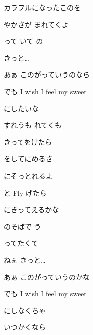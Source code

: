 \documentclass[14pt]{ltjsarticle}
\begin{document}
{  
カラフルになったこのを
  \jisho{}

  やかさが まれてくよ
  \jisho{}

  って いて の
  \jisho{}

  
きっと…
  \jisho{}

  
あぁ このがっていうのなら
  \jisho{}

  でも I wish I feel my sweet
  \jisho{}

  にしたいな
  \jisho{}

\item
  
すれうも れてくも
  \jisho{}

  きってをけたら
  \jisho{}

  をしてにめるさ
  \jisho{}

  にそっとれるよ
  \jisho{}

\item
  と Fly げたら
  \jisho{}

  にきってえるかな
  \jisho{}

  のそばで う
  \jisho{}

  ってたくて
  \jisho{}

  
ねぇ きっと…
  \jisho{}

  
あぁ このがっていうのかな
  \jisho{}

  でも I wish I feel my sweet
  \jisho{}

  にしなくちゃ
  \jisho{}

  
いつかくなら
  \jisho{}

  
}
\end{document}
